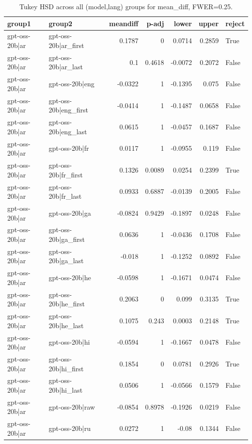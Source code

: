 \begin{table}
\caption{Tukey HSD across all (model,lang) groups for mean_diff, FWER=0.25.}
\label{tab:tukey_all_models_all_langs_mean_diff}
\begin{tabular}{l l r r r r l}
\toprule
group1 & group2 & meandiff & p-adj & lower & upper & reject \\
\midrule
gpt-oss-20b|ar & gpt-oss-20b|ar_first & 0.1787 & 0 & 0.0714 & 0.2859 & True \\
gpt-oss-20b|ar & gpt-oss-20b|ar_last & 0.1 & 0.4618 & -0.0072 & 0.2072 & False \\
gpt-oss-20b|ar & gpt-oss-20b|eng & -0.0322 & 1 & -0.1395 & 0.075 & False \\
gpt-oss-20b|ar & gpt-oss-20b|eng_first & -0.0414 & 1 & -0.1487 & 0.0658 & False \\
gpt-oss-20b|ar & gpt-oss-20b|eng_last & 0.0615 & 1 & -0.0457 & 0.1687 & False \\
gpt-oss-20b|ar & gpt-oss-20b|fr & 0.0117 & 1 & -0.0955 & 0.119 & False \\
gpt-oss-20b|ar & gpt-oss-20b|fr_first & 0.1326 & 0.0089 & 0.0254 & 0.2399 & True \\
gpt-oss-20b|ar & gpt-oss-20b|fr_last & 0.0933 & 0.6887 & -0.0139 & 0.2005 & False \\
gpt-oss-20b|ar & gpt-oss-20b|ga & -0.0824 & 0.9429 & -0.1897 & 0.0248 & False \\
gpt-oss-20b|ar & gpt-oss-20b|ga_first & 0.0636 & 1 & -0.0436 & 0.1708 & False \\
gpt-oss-20b|ar & gpt-oss-20b|ga_last & -0.018 & 1 & -0.1252 & 0.0892 & False \\
gpt-oss-20b|ar & gpt-oss-20b|he & -0.0598 & 1 & -0.1671 & 0.0474 & False \\
gpt-oss-20b|ar & gpt-oss-20b|he_first & 0.2063 & 0 & 0.099 & 0.3135 & True \\
gpt-oss-20b|ar & gpt-oss-20b|he_last & 0.1075 & 0.243 & 0.0003 & 0.2148 & True \\
gpt-oss-20b|ar & gpt-oss-20b|hi & -0.0594 & 1 & -0.1667 & 0.0478 & False \\
gpt-oss-20b|ar & gpt-oss-20b|hi_first & 0.1854 & 0 & 0.0781 & 0.2926 & True \\
gpt-oss-20b|ar & gpt-oss-20b|hi_last & 0.0506 & 1 & -0.0566 & 0.1579 & False \\
gpt-oss-20b|ar & gpt-oss-20b|raw & -0.0854 & 0.8978 & -0.1926 & 0.0219 & False \\
gpt-oss-20b|ar & gpt-oss-20b|ru & 0.0272 & 1 & -0.08 & 0.1344 & False \\

\end{tabular}
\end{table}
